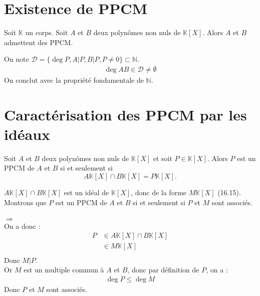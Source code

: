 \documentclass[../main.tex]{subfiles}
\begin{document}
\section{Existence de PPCM}
\begin{tcolorbox}[title=Propostion 16.29, title filled=false, colframe=lightblue, colback=lightblue!10!white]
    Soit $\mathbb{K}$ un corps. Soit $A$ et $B$ deux polynômes non nuls de $\mathbb{K}[X]$. Alors $A$ et $B$ admettent des PPCM. 
\end{tcolorbox}

\noindent On note $\mathcal{D} = \{ \deg P, A|P, B|P, P\neq 0 \} \subset \mathbb{N}$. \\
\begin{align*}
    \deg AB \in \mathcal{D} \neq \emptyset
\end{align*}
On conclut avec la propriété fondamentale de $\mathbb{N}$. 

\section{Caractérisation des PPCM par les idéaux}
\begin{tcolorbox}[title=Propostion 16.30, title filled=false, colframe=lightblue, colback=lightblue!10!white]
    Soit $A$ et $B$ deux polynômes non nuls de $\mathbb{K}[X]$ et soit $P \in \mathbb{K}[X]$. Alors $P$ est un PPCM de $A$ et $B$ si et seulement si 
    $$A \mathbb{K}[X] \cap B \mathbb{K}[X] = P \mathbb{K}[X].$$
\end{tcolorbox}

\noindent $A \mathbb{K}[X] \cap B \mathbb{K}[X]$ est un idéal de $\mathbb{K}[X]$, donc de la forme $M \mathbb{K}[X]$ (16.15). \\
Montrons que $P$ est un PPCM de $A$ et $B$ si et seulement si $P$ et $M$ sont associés. \\ \\

$\boxed{\Rightarrow}$ \\
On a donc : 
\begin{align*}
    P &\in A \mathbb{K}[X] \cap B \mathbb{K}[X] \\
    &\in M \mathbb{K}[X] \\
\end{align*}
Donc $M|P$. \\
Or $M$ est un multiple commun à $A$ et $B$, donc par définition de $P$, on a : 
\begin{align*}
    \boxed{\deg P \leq \deg M}
\end{align*}
Donc $P$ et $M$ sont associés. \\ \\
\end{document}

